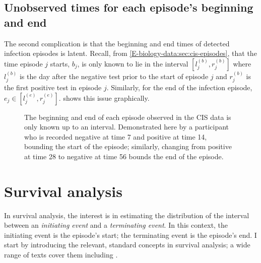 \documentclass[thesis.tex]{subfiles}
\begin{document}
\subsection{Unobserved times for each episode's beginning and end} \label{perf-test:sec:interval-censoring}

The second complication is that the beginning and end times of detected infection episodes is latent.
Recall, from \cref{E-biology-data:sec:cis-episodes}, that the time episode $j$ starts, $b_j$, is only known to lie in the interval $[l_j^{(b)}, r_j^{(b)}]$ where $l_j^{(b)}$ is the day after the negative test prior to the start of episode $j$ and $r_j^{(b)}$ is the first positive test in episode $j$.
Similarly, for the end of the infection episode, $e_j \in [l_j^{(e)}, r_j^{(e)}]$.
 shows this issue graphically.
\begin{figure}
  \caption[Double-interval censoring in CIS data]{%
        The beginning and end of each episode observed in the CIS data is only known up to an interval.
        Demonstrated here by a participant who is recorded negative at time 7 and positive at time 14, bounding the start of the episode; similarly, changing from positive at time 28 to negative at time 56 bounds the end of the episode.
    }
    \label{perf-test:fig:double-interval-censor}
\end{figure}

\section{Survival analysis} \label{perf-test:sec:surv-analysis}

In survival analysis, the interest is in estimating the distribution of the interval between an \emph{initiating event} and a \emph{terminating event}.
In this context, the initiating event is the episode's start; the terminating event is the episode's end.
I start by introducing the relevant, standard concepts in survival analysis; a wide range of texts cover them including \textcite[chapter 1]{bogaertsSurvival}.
\end{document}
